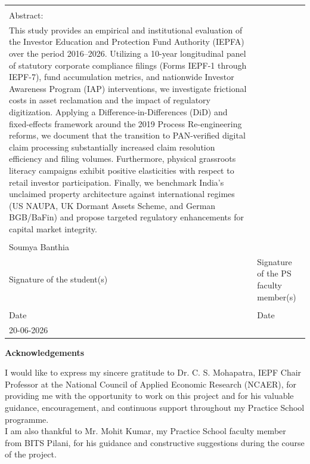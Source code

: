 \documentclass[openany]{book}
\begin{document}
{\begin{tabular}{p{6cm}l}
			& \\
			Abstract: & \\ \parbox[t]{16 cm} {This study provides an empirical and institutional evaluation of the Investor Education and Protection Fund Authority (IEPFA) over the period 2016--2026. Utilizing a 10-year longitudinal panel of statutory corporate compliance filings (Forms IEPF-1 through IEPF-7), fund accumulation metrics, and nationwide Investor Awareness Program (IAP) interventions, we investigate frictional costs in asset reclamation and the impact of regulatory digitization. Applying a Difference-in-Differences (DiD) and fixed-effects framework around the 2019 Process Re-engineering reforms, we document that the transition to PAN-verified digital claim processing substantially increased claim resolution efficiency and filing volumes. Furthermore, physical grassroots literacy campaigns exhibit positive elasticities with respect to retail investor participation. Finally, we benchmark India's unclaimed property architecture against international regimes (US NAUPA, UK Dormant Assets Scheme, and German BGB/BaFin) and propose targeted regulatory enhancements for capital market integrity.}\\
			& \\
            Soumya Banthia\\
			Signature of the student(s) & \hspace*{1cm}Signature of the PS faculty member(s) \\
			& \\
			Date & \hspace*{1cm}Date \\ 20-06-2026
		\end{tabular}}

	\newpage
	\centerline{\bf \Large Acknowledgements}
	\vspace*{0.5cm}
		\par\noindent 

I would like to express my sincere gratitude to Dr. C. S. Mohapatra, IEPF Chair Professor at the National Council of Applied Economic Research (NCAER), for providing me with the opportunity to work on this project and for his valuable guidance, encouragement, and continuous support throughout my Practice School programme. \\
        
I am also thankful to Mr. Mohit Kumar, my Practice School faculty member from BITS Pilani, for his guidance and constructive suggestions during the course of the project.\\
        
\end{document}
